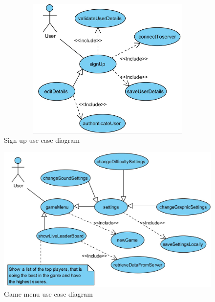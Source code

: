\documentclass[letterpaper]{article}
\begin{document}
		\begin{figure}[ht!]
		\centering
		\includegraphics[width=180mm, height=70mm]{UML_Diagram/Use_Case/signup}
		\caption{Sign up use case diagram}
		\label{overflow}
		\end{figure}
		
		\vspace{0.2in}
		
		\begin{figure}[H]
		\centering
		\includegraphics[width=180mm]{UML_Diagram/Use_Case/game_menu}
		\caption{Game menu use case diagram}
		\label{overflow}
		\end{figure}
		
		\section*{\colorbox{blue}{}} 
		\vspace{0.2in}
		
\end{document}
